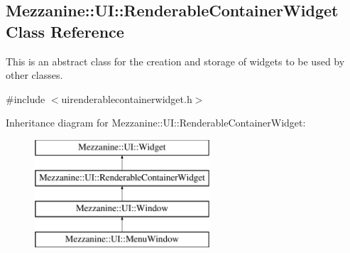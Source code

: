 \hypertarget{classMezzanine_1_1UI_1_1RenderableContainerWidget}{
\subsection{Mezzanine::UI::RenderableContainerWidget Class Reference}
\label{classMezzanine_1_1UI_1_1RenderableContainerWidget}
}


This is an abstract class for the creation and storage of widgets to be used by other classes.  




{\ttfamily \#include $<$uirenderablecontainerwidget.h$>$}

Inheritance diagram for Mezzanine::UI::RenderableContainerWidget:\begin{figure}[H]
\begin{center}
\leavevmode
\includegraphics[height=4.000000cm]{classMezzanine_1_1UI_1_1RenderableContainerWidget}
\end{center}
\end{figure}
